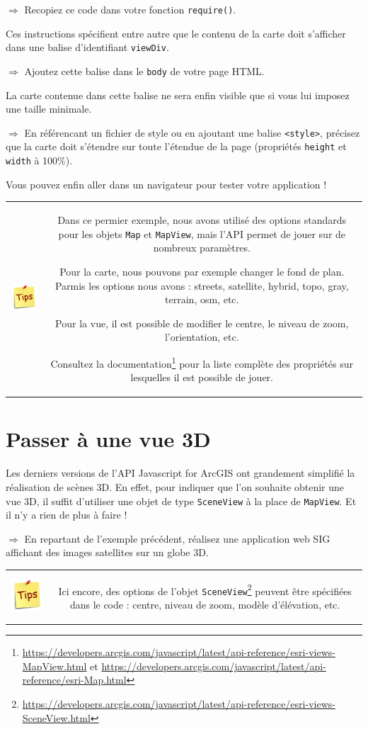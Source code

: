 \documentclass[11pt]{article}
\newcommand{\action}{$\Rightarrow$ }
\newenvironment{note}{%
	\begin{tabular}[t t]{c c}
		\includegraphics{img/tips.png}
		 &
		\begin{minipage}[c]{0.9\linewidth}
			\begin{sffamily}
}{%
			\end{sffamily}
		\end{minipage}
	\end{tabular}	
}
\newcommand{\code}[1]{\lstinline{#1}}
\begin{document}
\action Recopiez ce code dans votre fonction \code{require()}.

Ces instructions spécifient entre autre que le contenu de la carte doit s'afficher dans une balise d'identifiant \code{viewDiv}. 

\action Ajoutez cette balise dans le \code{body} de votre page HTML.

La carte contenue dans cette balise ne sera enfin visible que si vous lui imposez une taille minimale.

\action En référencant un fichier de style ou en ajoutant une balise \code{<style>}, précisez que la carte doit s'étendre sur toute l'étendue de la page (propriétés \code{height} et \code{width} à 100\%).

Vous pouvez enfin aller dans un navigateur pour tester votre application !

\begin{note}
Dans ce permier exemple, nous avons utilisé des options standards pour les objets \code{Map} et \code{MapView}, mais l'API permet de jouer sur de nombreux paramètres.

Pour la carte, nous pouvons par exemple changer le fond de plan. Parmis les options nous avons : streets, satellite, hybrid, topo, gray, terrain, osm, etc.

Pour la vue, il est possible de modifier le centre, le niveau de zoom, l'orientation, etc.

Consultez la documentation\footnote{\url{https://developers.arcgis.com/javascript/latest/api-reference/esri-views-MapView.html} et \url{https://developers.arcgis.com/javascript/latest/api-reference/esri-Map.html}} pour la liste complète des propriétés sur lesquelles il est possible de jouer.
\end{note}



\section{Passer à une vue 3D}
Les derniers versions de l'API Javascript for ArcGIS ont grandement simplifié la réalisation de scènes 3D. En effet, pour indiquer que l'on souhaite obtenir une vue 3D, il suffit d'utiliser une objet de type \code{SceneView} à la place de \code{MapView}. Et il n'y a rien de plus à faire !

\action En repartant de l'exemple précédent, réalisez une application web SIG affichant des images satellites sur un globe 3D.

\begin{note}
Ici encore, des options de l'objet \code{SceneView}\footnote{\url{https://developers.arcgis.com/javascript/latest/api-reference/esri-views-SceneView.html}} peuvent être spécifiées dans le code : centre, niveau de zoom, modèle d'élévation, etc.
\end{note}
\end{document}
